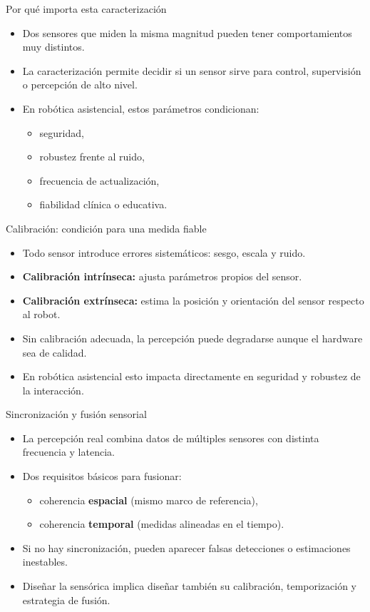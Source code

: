 \documentclass[aspectratio=169]{beamer}
\begin{document}
\begin{frame}{Por qué importa esta caracterización}
\small
\begin{itemize}
  \item Dos sensores que miden la misma magnitud pueden tener comportamientos muy distintos.
  \item La caracterización permite decidir si un sensor sirve para control, supervisión o percepción de alto nivel.
  \item En robótica asistencial, estos parámetros condicionan:
  \begin{itemize}
    \item seguridad,
    \item robustez frente al ruido,
    \item frecuencia de actualización,
    \item fiabilidad clínica o educativa.
  \end{itemize}
\end{itemize}
\end{frame}

\begin{frame}{Calibración: condición para una medida fiable}
\small
\begin{itemize}
  \item Todo sensor introduce errores sistemáticos: sesgo, escala y ruido.
  \item \textbf{Calibración intrínseca:} ajusta parámetros propios del sensor.
  \item \textbf{Calibración extrínseca:} estima la posición y orientación del sensor respecto al robot.
  \item Sin calibración adecuada, la percepción puede degradarse aunque el hardware sea de calidad.
  \item En robótica asistencial esto impacta directamente en seguridad y robustez de la interacción.
\end{itemize}
\end{frame}

\begin{frame}{Sincronización y fusión sensorial}
\small
\begin{itemize}
  \item La percepción real combina datos de múltiples sensores con distinta frecuencia y latencia.
  \item Dos requisitos básicos para fusionar:
  \begin{itemize}
    \item coherencia \textbf{espacial} (mismo marco de referencia),
    \item coherencia \textbf{temporal} (medidas alineadas en el tiempo).
  \end{itemize}
  \item Si no hay sincronización, pueden aparecer falsas detecciones o estimaciones inestables.
  \item Diseñar la sensórica implica diseñar también su calibración, temporización y estrategia de fusión.
\end{itemize}
\end{frame}
\end{document}
